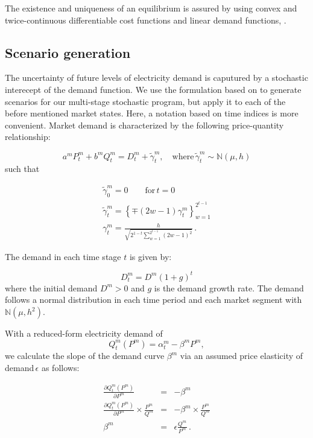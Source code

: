The existence and uniqueness of an equilibrium is assured by using convex and twice-continuous differentiable cost functions and linear demand functions, \citep[see e.g.][]{Murphy1982}. 


\subsection{Scenario generation}
\label{sec:scenario-generation}

The uncertainty of future levels of electricity demand is caputured by a stochastic interecept of the demand function. We use the formulation based on \cite{Genc2007} to generate scenarios for our multi-stage stochastic program, but apply it to each of the before mentioned market states. Here, a notation based on time indices is more convenient. Market demand is characterized by the following price-quantity relationship:

\begin{equation}
  \label{eq:marketdemandpq}
  a^mP^m_t+b^mQ^m_t=D^m_t+\tilde{\gamma}^m_t, \quad \mbox{where}\, \tilde{\gamma}^m_t\sim\mathbb{N}(\mu,h)
\end{equation}
such that

\begin{eqnarray*}
  \label{eq:3}
  \tilde{\gamma}^m_0=0\qquad\mbox{for}\, t=0\\
   \tilde{\gamma}^m_t=\left\{\mp(2w-1)\gamma^m_t\right\}_{w=1}^{2^{t-1}}\\
   \gamma^m_t=\frac{h}{\sqrt{2^{1-t}\sum_{w=1}^{2^{t-1}}(2w-1)^2}}\,.
\end{eqnarray*}

The demand in each time stage $t$ is given by:

\begin{equation}
  \label{eq:demandgrowth}
  D^m_t = D^m(1+g)^t
\end{equation}
where the initial demand $D^m>0$ and $g$ is the demand growth rate. The demand follows a normal distribution in each time period and each market segment with $\mathbb{N}(\mu, h^2)$.

With a reduced-form electricity demand of
\begin{equation*}
  \label{eq:5}
  Q^m_t(P^m) = \alpha^m_t-\beta^m P^m, 
\end{equation*}
we calculate the slope of the demand curve $\beta^m$  via an assumed price elasticity of demand\,$\epsilon$ as follows:

\begin{eqnarray}
  \frac{\partial Q^m_t(P^m)}{\partial P^m} &=& -\beta^m \nonumber\\
  \frac{\partial Q^m_t(P^m)}{\partial P^m}\times\frac{P^m}{Q^m} &=& -\beta^m\times\frac{P^m}{Q^m} \nonumber \\
\beta^m &=& \epsilon\frac{Q^m}{P^m}\label{eq:demandslope}\,.
\end{eqnarray}


